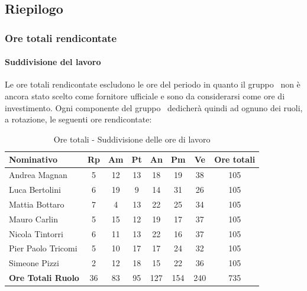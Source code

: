 \documentclass[./PianoDiProgetto.tex]{subfiles}
\begin{document}
\vspace{35mm}

	\subsection{Riepilogo}
			\subsubsection{Ore totali rendicontate}
				\paragraph{Suddivisione del lavoro}
					Le ore totali rendicontate escludono le ore del periodo \PerAR{} in quanto il gruppo \GRUPPO\ non è ancora stato scelto come fornitore ufficiale e sono da considerarsi come ore di investimento. Ogni componente del gruppo \GRUPPO\ dedicherà quindi ad ognuno dei ruoli, a rotazione, le seguenti ore rendicontate:

	\begin{table}[H]
		\begin{tabularx}{\textwidth}{l  * {6}{c}  c}
			\toprule
			\textbf{Nominativo} & \textbf{Rp} & \textbf{Am} & \textbf{Pt}
						& \textbf{An} & \textbf{Pm} & \textbf{Ve} & \textbf{Ore totali} \\
			\midrule
			Andrea Magnan  & 5  & 12 & 13 & 18 & 19  & 38 & 105 \\
			Luca Bertolini  & 6 & 19 & 9 & 14 & 31 & 26 & 105 \\
			Mattia Bottaro  & 7  & 4 & 13 & 22 & 25  & 34 & 105 \\
			Mauro Carlin  & 5 & 15 & 12 & 19 & 17 & 37 & 105 \\
			Nicola Tintorri  & 6 & 11 & 13 & 22 & 16 & 37 & 105 \\
			Pier Paolo Tricomi  & 5 & 10 & 17 & 17 & 24 & 32 & 105 \\
			Simeone Pizzi & 2 & 12 & 18 & 15 & 22 & 36 & 105 \\
			\midrule
			\textbf{Ore Totali Ruolo} & 36    & 83   & 95   & 127   & 154 & 240   & 735 \\
			\bottomrule
		\end{tabularx}
		\caption{Ore totali - Suddivisione delle ore di lavoro}
	\end{table}


\vfill
\end{document}
